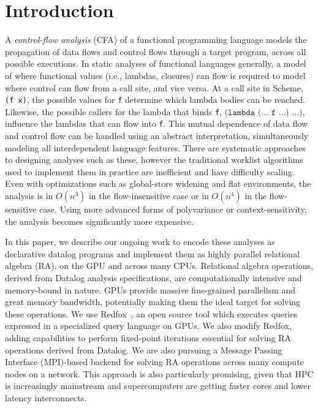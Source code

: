 
\section{Introduction}
%
A \textit{control-flow analysis} (CFA) of a functional programming language models the
propagation of data flows and control flows through a target program, across all
possible executions.
%
In static analyses of functional languages generally, a model of where functional values
(i.e., lambdas, closures) can flow is required to model where control can flow
from a call site, and vice versa.
%
At a call site in Scheme, \texttt{(f x)}, the possible values for \texttt{f} determine
which lambda bodies can be reached.
%
Likewise, the possible callers for the lambda that binds \texttt{f},
$\texttt{(lambda ($\ldots$ f $\ldots$) $\ldots$)}$, influence the lambdas that
can flow into \texttt{f}.
%
This mutual dependence of data flow and control flow can be handled using an abstract interpretation,
simultaneously modeling all interdependent language features.
%
There are systematic approaches to designing analyses such as these, however the traditional worklist algorithms
used to implement them in practice are inefficient and have difficulty scaling.
%
Even with optimizations such as global-store widening and flat environments, the analysis is in $O(n^3)$ in the
flow-insensitive case or in $O(n^4)$ in the flow-sensitive case.
%
Using more advanced forms of polyvariance or context-sensitivity, the analysis becomes significantly more expensive.


In this paper, we describe our ongoing work to encode these analyses as declarative datalog programs and
implement them as highly parallel relational algebra (RA), on the GPU and across many CPUs.
%
Relational algebra operations, derived from Datalog analysis specifications, are computationally intensive and memory-bound in nature.
%
GPUs provide massive fine-grained parallelism and great memory bandwidth, potentially making them the ideal
target for solving these operations. We use Redfox~\cite{Wu:2014:RFE:2581122.2544166}, an open source tool which 
executes queries expressed in a specialized query language on GPUs. We also modify Redfox, adding
capabilities to perform fixed-point iterations essential for solving RA operations derived from Datalog.
%
We are also pursuing a Message Passing Interface (MPI)-based backend for solving RA operations across many compute nodes on a network. 
This approach is also particularly promising, given that HPC is increasingly mainstream and supercomputers are getting
faster cores and lower latency interconnects.


